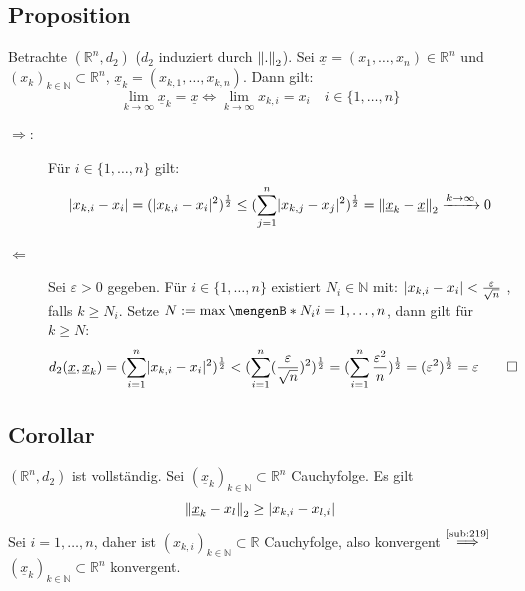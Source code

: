 \subsection[Proposition über Konvergenz von Vektoren]{Proposition} %
\label{sub:219}
Betrachte $(\mathds{R}^n, d_2)$ ($d_2$ induziert durch $\norm[2]{.} $). Sei $\underline{x}= (x_1, \ldots , x_n) \in \mathds{R}^n$ und 
$(x_k)_{k \in \mathds{N}} \subset \mathds{R}^n$, $\underline{x}_k = (x_{k,1}, \ldots , x_{k,n})$. Dann gilt: 
\[
	\lim\limits_{ k \to \infty}  \underline{x}_k = \underline{x} \iff \lim\limits_{ k \to \infty} x_{k,i} = x_i \quad i \in \{1, \ldots , n\}
\]
\begin{description}
	\item[\glqq $\Rightarrow$\grqq:] Für $i \in \{1, \ldots , n\}$ gilt:
	\begin{align*}
		\abs{x_{k,i} - x_i} = \enbrace{\abs{x_{k,i} -  x_i}^2 }^{\frac{1}{2}} \le \enbrace{\sum_{j=1}^{n} \abs{x_{k,j} - x_j}^2 }^{\frac{1}{2} }  
		= \norm[2]{\underline{x}_k - \underline{x}  } \xrightarrow{k \to \infty} 0 
	\end{align*}
	\item[\glqq $\Leftarrow$\grqq] Sei $\varepsilon >0$ gegeben. Für $i \in \{1, \ldots , n\}$ existiert $N_i \in \mathds{N}$ mit: 
	$\lvert x_{k,i} - x_i\rvert < \frac{\varepsilon}{\sqrt{n}}  $ , falls $k \ge N_i$. Setze $N:= \max \set[N_i]{i=1, \ldots , n}$, dann gilt für $k \ge N$:
	\begin{align*}
		d_2(\underline{x} , \underline{x}_k)= ( \sum_{i=1}^{n}  \lvert x_{k,i} - x_i\rvert^2 )^{\frac{1}{2} } < ( \sum_{i=1}^{n} 
		 (\frac{\varepsilon}{\sqrt{n} } )^2 )^{\frac{1}{2} } = ( \sum_{i=1}^{n}  \frac{\varepsilon^2}{n} )^{\frac{1}{2} } = 
		 (\varepsilon^2)^{\frac{1}{2}} = \varepsilon \tag*{$\square$} 
	\end{align*}
\end{description}

\subsection[Corollar: $(\mathds{R}^n, d_2)$ ist vollständig]{Corollar} %
\label{sub:220}
$(\mathds{R}^n, d_2)$ ist vollständig.
Sei $(\underline{x}_k)_{k \in \mathds{N}} \subset \mathds{R}^n$ Cauchyfolge. Es gilt
\[
	\norm[2]{\underline{x}_k - x_l } \ge \abs{x_{k,i} - x_{l,i}}  
\]
Sei $i= 1, \ldots , n$, daher ist $(x_{k,i})_{k \in \mathds{N}} \subset \mathds{R}$ Cauchyfolge, also konvergent $\overset{\text{\ref{sub:219}}}{\Longrightarrow}$
$(\underline{x}_k)_{k \in \mathds{N}} \subset \mathds{R}^n$ konvergent. \bewende
\newpage

